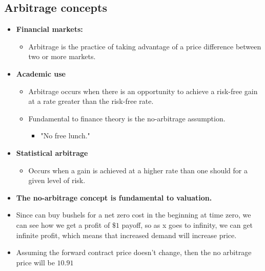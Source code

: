 \subsection{Arbitrage concepts}
\begin{terminology}
    \begin{itemize}
        \item \textbf{Financial markets:}
        \begin{itemize}
            \item Arbitrage is the practice of taking advantage of a price difference between two or more markets.
        \end{itemize}
    
        \item \textbf{Academic use}
        \begin{itemize}
            \item Arbitrage occurs when there is an opportunity to achieve a risk-free gain at a rate greater than the risk-free rate.
            \item Fundamental to finance theory is the no-arbitrage assumption.
            \begin{itemize}
                \item "No free lunch."
            \end{itemize}
        \end{itemize}
    
        \item \textbf{Statistical arbitrage}
        \begin{itemize}
            \item Occurs when a gain is achieved at a higher rate than one should for a given level of risk.
        \end{itemize}
    
        \item \textbf{The no-arbitrage concept is fundamental to valuation.}
    \end{itemize}
\end{terminology}

\begin{example}
    \begin{itemize}
        \item Since can buy bushels for a net zero cost in the beginning at time zero, we can see how we get a profit of $\$1$ payoff, so as x goes to infinity, we can get infinite profit, which means that increased demand will increase price.
        \item Assuming the forward contract price doesn't change, then the no arbitrage price will be $10.91$
    \end{itemize}
\end{example}

